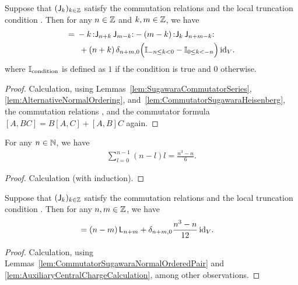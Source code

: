 \begin{lemma}
  \label{lem:CommutatorSugawaraNormalOrderedPair}
  \leanok
  Suppose that $(\mathsf{J}_{k})_{k \in \mathbb{Z}}$ satisfy the commutation relations
  \tagHeiComm{} and the local truncation condition
  \tagHeiTrunc{}. Then for any $n \in \mathbb{Z}$ and $k, m \in \mathbb{Z}$, we have
  \begin{align*}
    [\Loper_n, \normalOrder{\Joper_k \, \Joper_{m-k}}]
    = \; &
    -k \, \normalOrder{\Joper_{n+k} \, \Joper_{m-k}}
    - (m-k) \, \normalOrder{\Joper_{k} \, \Joper_{n+m-k}} \\
      & \; + (n+k) \, \delta_{n+m,0}
        \Big( \indicator{-n \le k < 0} - \indicator{0 \le k < - n} \Big) \, \id_V .
  \end{align*}
  where $\mathbb{I}_{{\mathrm{condition}}}$ is defined as $1$ if the condition is true
  and $0$ otherwise.
\end{lemma}
\begin{proof}
  \leanok
  Calculation, using Lemmas~\ref{lem:SugawaraCommutatorSeries},
  \ref{lem:AlternativeNormalOrdering}, and~\ref{lem:CommutatorSugawaraHeisenberg},
  the commutation relations \tagHeiComm{},
  and the commutator formula $[A,BC] = B[A,C] + [A,B]C$ again.
\end{proof}

\begin{lemma}
  \label{lem:AuxiliaryCentralChargeCalculation}
  \leanok
  For any $n \in \mathbb{N}$, we have
  \begin{align*}
    \sum_{l=0}^{n-1} (n-l) l = \frac{n^3 - n}{6} .
  \end{align*}
\end{lemma}
\begin{proof}
  \leanok
  Calculation (with induction).
\end{proof}

\begin{lemma}
  \label{lem:CommutatorSugawara}
  \leanok
  Suppose that $(\mathsf{J}_{k})_{k \in \mathbb{Z}}$ satisfy the commutation relations
  \tagHeiComm{} and the local truncation condition
  \tagHeiTrunc{}. Then for any $n, m \in \mathbb{Z}$, we have
  \begin{align*}
    [\Loper_n, \Loper_m]
    = \; &
    (n-m) \, \Loper_{n+m} + \delta_{n+m,0} \frac{n^3 - n}{12} \, \id_V .
  \end{align*}
\end{lemma}
\begin{proof}
  \leanok
  Calculation, using Lemmas~\ref{lem:CommutatorSugawaraNormalOrderedPair}
  and \ref{lem:AuxiliaryCentralChargeCalculation}, among other observations.
\end{proof}

